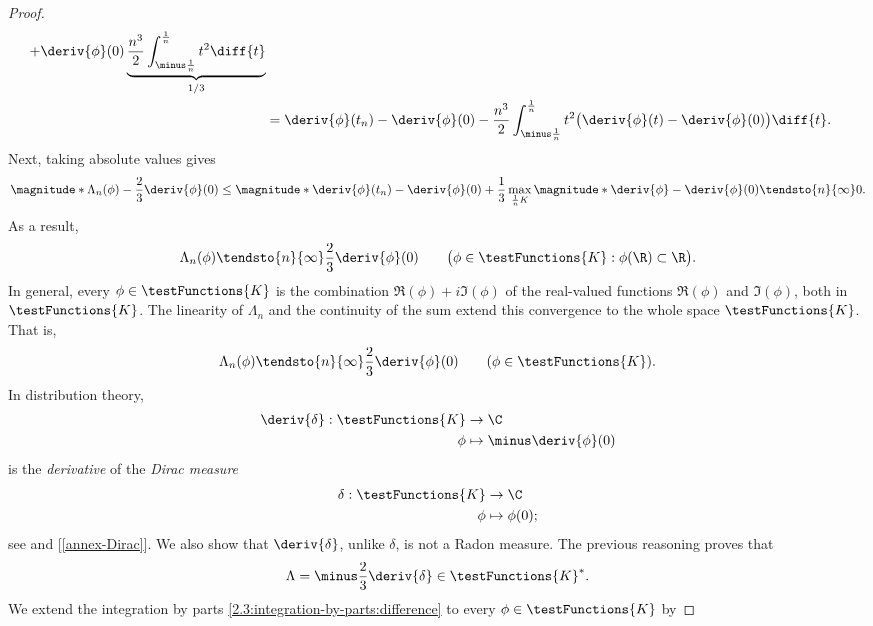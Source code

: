 \begin{proof}
\begin{align}
    + \deriv{\phi}(0) \underbrace{\frac{n^3}{2} \int_{\minus \frac{1}{n}}^{\frac{1}{n}} t^{2} \diff{t}}_{1/3} \\
  & = \deriv{\phi}(t_n) 
    - \deriv{\phi}(0)
  - \frac{n^3}{2} \int_{\minus \frac{1}{n}}^{\frac{1}{n}} t^2 \bigl(\deriv{\phi}(t) - \deriv{\phi}(0)\bigr)  \diff{t}.
\end{align}
% 
Next, taking absolute values gives %
% 
\begin{equation}
  \magnitude*{\Lambda_n(\phi) - \frac{2}{3}\deriv{\phi}(0)} \leq \magnitude*{\deriv{\phi}(t_n) - \deriv{\phi}(0)} 
  + \frac{1}{3}\max_{\frac{1}{n}K}{\magnitude*{\deriv{\phi} - \deriv{\phi}(0)}} \tendsto{n}{\infty} 0.
\end{equation}
% 
As a result, %
% 
\begin{equation}
  \Lambda_n(\phi) \tendsto{n}{\infty} \frac{2}{3}\deriv{\phi}(0) %
    \qquad \bigl(\phi\in \testFunctions{K}: \phi(\R) \subset \R\bigr). 
\end{equation}
% 
In general, every $\phi \in \testFunctions{K}$ is the combination $\Re(\phi) + i\Im(\phi)$ of the real-valued %
functions $\Re(\phi)$ and $\Im(\phi)$, both in $\testFunctions{K}$. The linearity of $\Lambda_n$ and the continuity of %
the sum extend this convergence to the whole space $\testFunctions{K}$. That is, 
% 
\begin{equation}\label{2.3:convergence-to-dirac}
  \Lambda_n(\phi) \tendsto{n}{\infty} \frac{2}{3}\deriv{\phi}(0) \qquad (\phi\in \testFunctions{K}).
\end{equation}
% 
In distribution theory, %
% 
\begin{align}
  \deriv{\delta}: \testFunctions{K} & \to \C \\
  \phi & \mapsto \minus \deriv{\phi}(0)  \nonumber
\end{align}
% 
is the \emph{derivative} of the \emph{Dirac measure} %
% 
\begin{align}
  \delta: \testFunctions{K} & \to \C \\
  \phi & \mapsto \phi(0);  \nonumber
\end{align}
% 
see  and [\ref{annex-Dirac}]. We also show that $\deriv{\delta}$, unlike $\delta$, is not %
a Radon measure. The previous reasoning proves that %
% 
\begin{equation}\label{2.3:Lambda-is-continuous}
  \Lambda = \minus \frac{2}{3}\deriv{\delta} \in \testFunctions{K}^\ast.
\end{equation}
% 
We extend the integration by parts \eqref{2.3:integration-by-parts:difference} to every $\phi \in \testFunctions{K}$ by %

\end{proof}
